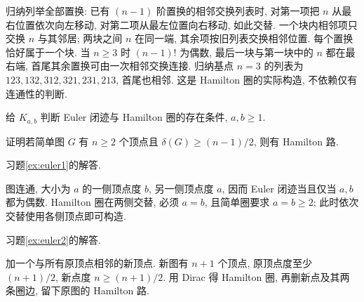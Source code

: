 归纳列举全部置换: 已有 $(n-1)$ 阶置换的相邻交换列表时, 对第一项把 $n$ 从最右位置依次向左移动, 对第二项从最左位置向右移动, 如此交替. 一个块内相邻项只交换 $n$ 与其邻居; 两块之间 $n$ 在同一端, 其余项按旧列表交换相邻位置. 每个置换恰好属于一个块. 当 $n\ge3$ 时 $(n-1)!$ 为偶数, 最后一块与第一块中的 $n$ 都在最右端, 首尾其余置换可由一次相邻交换连接. 归纳基点 $n=3$ 的列表为 $123,132,312,321,231,213$, 首尾也相邻. 这是 Hamilton 圈的实际构造, 不依赖仅有连通性的判断.
\begin{exercise}\label{ex:euler1}
给 $K_{a,b}$ 判断 Euler 闭迹与 Hamilton 圈的存在条件, $a,b\ge1$.
\end{exercise}
\begin{exercise}\label{ex:euler2}
证明若简单图 $G$ 有 $n\ge2$ 个顶点且 $\delta(G)\ge(n-1)/2$, 则有 Hamilton 路.
\end{exercise}
习题\ref{ex:euler1}的解答.
\begin{solution}
图连通, 大小为 $a$ 的一侧顶点度 $b$, 另一侧顶点度 $a$, 因而 Euler 闭迹当且仅当 $a,b$ 都为偶数. Hamilton 圈在两侧交替, 必须 $a=b$, 且简单圈要求 $a=b\ge2$; 此时依次交替使用各侧顶点即可构造.
\end{solution}
习题\ref{ex:euler2}的解答.
\begin{solution}
加一个与所有原顶点相邻的新顶点. 新图有 $n+1$ 个顶点, 原顶点度至少 $(n+1)/2$, 新点度 $n\ge(n+1)/2$. 用 Dirac 得 Hamilton 圈, 再删新点及其两条圈边, 留下原图的 Hamilton 路.
\end{solution}
